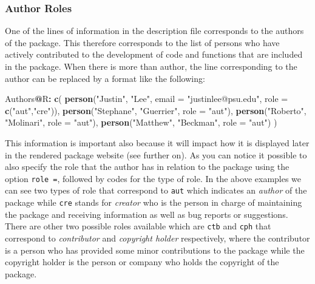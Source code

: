 \documentclass[12pt,]{krantz}
\newenvironment{Shaded}{\begin{snugshade}}{\end{snugshade}}
\newcommand{\KeywordTok}[1]{\textcolor[rgb]{0.27,0.27,0.27}{\textbf{#1}}}
\newcommand{\DataTypeTok}[1]{\textcolor[rgb]{0.27,0.27,0.27}{#1}}
\newcommand{\StringTok}[1]{\textcolor[rgb]{0.5,0.5,0.5}{#1}}
\newcommand{\OperatorTok}[1]{\textcolor[rgb]{0.43,0.43,0.43}{\textbf{#1}}}
\newcommand{\NormalTok}[1]{#1}
\begin{document}
\subsubsection*{Author Roles}\label{author-roles}


One of the lines of information in the description file corresponds to
the authors of the package. This therefore corresponds to the list of
persons who have actively contributed to the development of code and
functions that are included in the package. When there is more than
author, the line corresponding to the author can be replaced by a format
like the following:

\begin{Shaded}
\begin{Highlighting}[]
\NormalTok{Authors}\OperatorTok{@}\NormalTok{R}\OperatorTok{:}\StringTok{ }\KeywordTok{c}\NormalTok{(}
    \KeywordTok{person}\NormalTok{(}\StringTok{"Justin"}\NormalTok{, }\StringTok{"Lee"}\NormalTok{, }\DataTypeTok{email =} \StringTok{"justinlee@psu.edu"}\NormalTok{, }\DataTypeTok{role =} \KeywordTok{c}\NormalTok{(}\StringTok{"aut"}\NormalTok{,}\StringTok{"cre"}\NormalTok{)),}
    \KeywordTok{person}\NormalTok{(}\StringTok{"Stephane"}\NormalTok{, }\StringTok{"Guerrier"}\NormalTok{, }\DataTypeTok{role =} \StringTok{"aut"}\NormalTok{),}
    \KeywordTok{person}\NormalTok{(}\StringTok{"Roberto"}\NormalTok{, }\StringTok{"Molinari"}\NormalTok{, }\DataTypeTok{role =} \StringTok{"aut"}\NormalTok{),}
    \KeywordTok{person}\NormalTok{(}\StringTok{"Matthew"}\NormalTok{, }\StringTok{"Beckman"}\NormalTok{, }\DataTypeTok{role =} \StringTok{"aut"}\NormalTok{)}
\NormalTok{    )}
\end{Highlighting}
\end{Shaded}

This information is important also because it will impact how it is
displayed later in the rendered package website (see further on). As you
can notice it possible to also specify the role that the author has in
relation to the package using the option \texttt{role\ =}, followed by
codes for the type of role. In the above examples we can see two types
of role that correspond to \texttt{aut} which indicates an \emph{author}
of the package while \texttt{cre} stands for \emph{creator} who is the
person in charge of maintaining the package and receiving information as
well as bug reports or suggestions. There are other two possible roles
available which are \texttt{ctb} and \texttt{cph} that correspond to
\emph{contributor} and \emph{copyright holder} respectively, where the
contributor is a person who has provided some minor contributions to the
package while the copyright holder is the person or company who holds
the copyright of the package.
\end{document}
